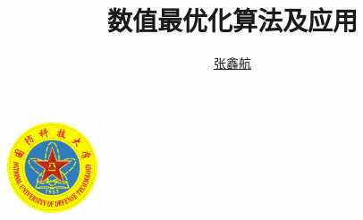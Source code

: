 \documentclass[cn,blue,12pt,normal]{elegantnote}
\title{数值最优化算法及应用}
\author{\href{mailto:zhangxinhang19@foxmail.com}{张鑫航}}
\institute{国防科技大学}
\date{\zhtoday}
\begin{document}
\maketitle
\centerline{
  \includegraphics[width=0.2\textwidth]{figure/logo.pdf}
}
\newpage
\tableofcontents
\newpage





\end{document}
